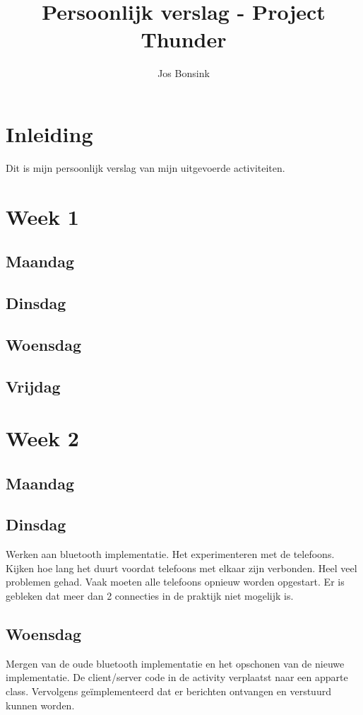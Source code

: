 \documentclass[12pt]{article}
\author{Jos Bonsink}
\begin{document}
\title{Persoonlijk verslag - Project Thunder}
\maketitle

\section*{Inleiding}
Dit is mijn persoonlijk verslag van mijn uitgevoerde activiteiten.

\section*{Week 1}
\subsection*{Maandag}


\subsection*{Dinsdag}


\subsection*{Woensdag}


\subsection*{Vrijdag}


\section*{Week 2}
\subsection*{Maandag}
\subsection*{Dinsdag}
Werken aan bluetooth implementatie. Het experimenteren met de telefoons. Kijken hoe lang het duurt voordat telefoons met elkaar zijn verbonden. Heel veel problemen gehad. Vaak moeten alle telefoons opnieuw worden opgestart. Er is gebleken dat meer dan 2 connecties in de praktijk niet mogelijk is.

\subsection*{Woensdag}
Mergen van de oude bluetooth implementatie en het opschonen van de nieuwe implementatie. De client/server code in de activity verplaatst naar een apparte class. Vervolgens ge\"implementeerd dat er berichten ontvangen en verstuurd kunnen worden.
\end{document}
